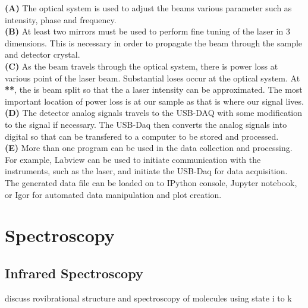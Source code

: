 \documentclass[a4paper]{book}
\begin{document}
	\noindent
	{\bfseries (A)} The optical system is used to adjust the beams various parameter such as intensity, phase and frequency.\\
	{\bfseries (B)} At least two mirrors must be used to perform fine tuning of the laser in 3 dimensions. This is necessary in order to propagate the beam through the sample and detector crystal. \\
	{\bfseries (C)} As the beam travels through the optical system, there is power loss at various point of the laser beam. Substantial loses occur at the optical system. At {\bfseries ***}, the is beam split so that the a laser intensity can be approximated. The most important location of power loss is at our sample as that is where our signal lives.\\
	{\bfseries(D)} The detector analog signals travels to the USB-DAQ with some modification to the signal if necessary. The USB-Daq then converts the analog signals into digital so that can be transfered to a computer to be stored and processed. \\
	{\bfseries(E)} More than one program can be used in the data collection and processing. For example, Labview can be used to initiate communication with the instruments, such as the laser, and initiate the USB-Daq for data acquisition. The generated data file can be loaded on to IPython console, Jupyter notebook, or Igor for automated data manipulation and plot creation.		

\chapter{Spectroscopy}
\section{Infrared Spectroscopy} 
discuss rovibrational structure and spectroscopy of molecules
using state i to k 

\end{document}
